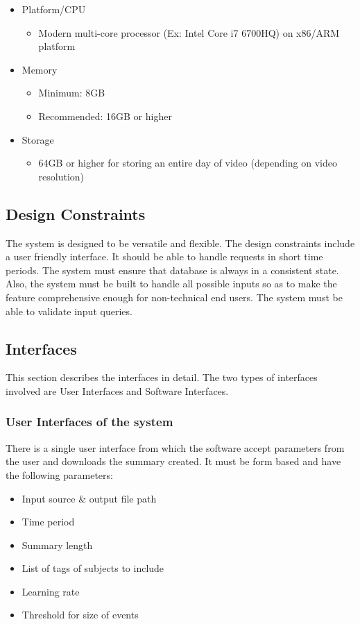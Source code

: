     \begin{itemize}
        \item Platform/CPU
        \begin{itemize}
            \item Modern multi-core processor (Ex: Intel Core i7 6700HQ) on x86/ARM platform
        \end{itemize}
        \item Memory
        \begin{itemize}
            \item Minimum: 8GB
            \item Recommended: 16GB or higher
        \end{itemize}
        \item Storage
        \begin{itemize}
            \item 64GB or higher for storing an entire day of video (depending on video resolution)
        \end{itemize}
    \end{itemize}

    \subsection{Design Constraints}
    The system is designed to be versatile and flexible. The design constraints include a user friendly interface. It should be able to handle requests in short time periods. The system must ensure that database is always in a consistent state. Also, the system must be built to handle all possible inputs so as to make the feature comprehensive enough for non-technical end users. The system must be able to validate input queries.

    \subsection{Interfaces}
    This section describes the interfaces in detail. The two types of interfaces involved are User Interfaces and Software Interfaces.
        \subsubsection{User Interfaces of the system}
        There is a single user interface from which the software accept parameters from the user and downloads the summary created. It must be form based and have the following parameters:
        \begin{itemize}
            \item Input source \& output file path
            \item Time period
            \item Summary length
            \item List of tags of subjects to include
            \item Learning rate
            \item Threshold for size of events
        \end{itemize}

